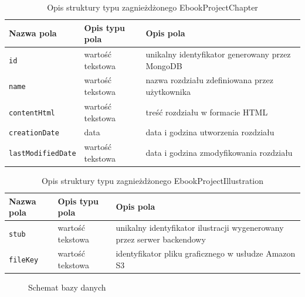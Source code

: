 \begin{table}
    \caption{Opis struktury typu zagnieżdżonego EbookProjectChapter}
    \renewcommand{\arraystretch}{1.3} %
    \centering
    \begin{tabular}{|>{\centering\arraybackslash}m{4.7cm}|>{\centering\arraybackslash}m{4.7cm}|>{\centering\arraybackslash}m{4.7cm}|} \hline
        \textbf{Nazwa pola} & \textbf{Opis typu pola} & \textbf{Opis pola} \\ \hline
        \verb|id| & wartość tekstowa & unikalny identyfikator generowany przez MongoDB \\ \hline
        \verb|name| & wartość tekstowa & nazwa rozdziału zdefiniowana przez użytkownika \\ \hline
        \verb|contentHtml| & wartość tekstowa & treść rozdziału w formacie HTML  \\ \hline
        \verb|creationDate| & data & data i godzina utworzenia rozdziału \\ \hline
        \verb|lastModifiedDate| & wartość tekstowa & data i godzina zmodyfikowania rozdziału \\ \hline
    \end{tabular}
    \label{tab:ebook_project_chapter_db_struct}
\end{table}

\begin{table}
    \caption{Opis struktury typu zagnieżdżonego EbookProjectIllustration}
    \renewcommand{\arraystretch}{1.3} %
    \centering
    \begin{tabular}{|>{\centering\arraybackslash}m{4.7cm}|>{\centering\arraybackslash}m{4.7cm}|>{\centering\arraybackslash}m{4.7cm}|} \hline
        \textbf{Nazwa pola} & \textbf{Opis typu pola} & \textbf{Opis pola} \\ \hline
        \verb|stub| & wartość tekstowa & unikalny identyfikator ilustracji wygenerowany przez serwer backendowy \\ \hline
        \verb|fileKey| & wartość tekstowa & identyfikator pliku graficznego w usłudze Amazon S3 \\ \hline
    \end{tabular}
    \label{tab:ebook_project_illustration_db_struct}
\end{table}

\begin{figure}[h]
    \centering
    \setlength{\fboxsep}{0pt}
    \setlength{\fboxrule}{0.4pt}
    
    \caption{Schemat bazy danych}
    \label{list:db_scheme_diagram}
\end{figure}

